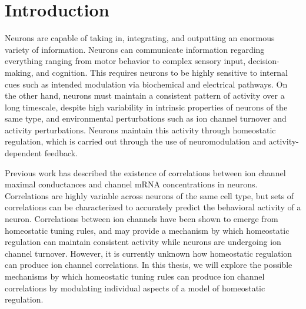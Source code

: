 \chapter{Introduction}\label{ch:introduction}
    Neurons are capable of taking in, integrating, and outputting an enormous variety of information. Neurons can communicate information regarding everything ranging from motor behavior to complex sensory input, decision-making, and cognition. This requires neurons to be highly sensitive to internal cues such as intended modulation via biochemical and electrical pathways. On the other hand, neurons must maintain a consistent pattern of activity over a long timescale, despite high variability in intrinsic properties of neurons of the same type, and environmental perturbations such as ion channel turnover and activity perturbations. Neurons maintain this activity through homeostatic regulation, which is carried out through the use of neuromodulation and activity-dependent feedback\cite{liu_model_1998,lemasson_activity-dependent_1993,turrigiano_homeostatic_2004,cudmore_long-term_2004,desai_plasticity_1999,li_importance_2004,loebrich_function_2009,zhang_other_2003}.
    
    Previous work has described the existence of correlations between ion channel maximal conductances and channel mRNA concentrations in neurons\cite{schulz_variable_2006,schulz_quantitative_2007,golowasch_activity-dependent_1999}. Correlations are highly variable across neurons of the same cell type, but sets of correlations can be characterized to accurately predict the behavioral activity of a neuron. Correlations between ion channels have been shown to emerge from homeostatic tuning rules\cite{oleary_correlations_2013}, and may provide a mechanism by which homeostatic regulation can maintain consistent activity while neurons are undergoing ion channel turnover\cite{oleary_cell_2014}. However, it is currently unknown how homeostatic regulation can produce ion channel correlations. In this thesis, we will explore the possible mechanisms by which homeostatic tuning rules can produce ion channel correlations by modulating individual aspects of a model of homeostatic regulation.
    

